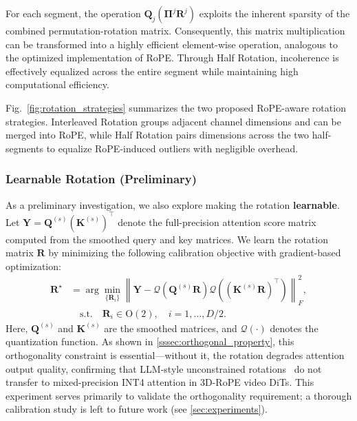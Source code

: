 For each segment, the operation $\mathbf{Q}_j(\mathbf{\Pi}^j \mathbf{R}^j)$ exploits the inherent sparsity of the combined permutation-rotation matrix. Consequently, this matrix multiplication can be transformed into a highly efficient element-wise operation, analogous to the optimized implementation of RoPE. Through Half Rotation, incoherence is effectively equalized across the entire segment while maintaining high computational efficiency.

Fig.~\ref{fig:rotation_strategies} summarizes the two proposed RoPE-aware rotation strategies. Interleaved Rotation groups adjacent channel dimensions and can be merged into RoPE, while Half Rotation pairs dimensions across the two half-segments to equalize RoPE-induced outliers with negligible overhead.



\subsubsection{Learnable Rotation (Preliminary)}
\label{sssec:learnable_rotation}

As a preliminary investigation, we also explore making the rotation \textbf{learnable}. Let $\mathbf{Y} = \mathbf{Q}^{(s)}(\mathbf{K}^{(s)})^\top$ denote the full-precision attention score matrix computed from the smoothed query and key matrices. We learn the rotation matrix $\mathbf{R}$ by minimizing the following calibration objective with gradient-based optimization:
\begin{align}
\mathbf{R}^{\star}
&=
\arg\min_{\{\mathbf{R}_i\}}
\left\|
\mathbf{Y}
-
\mathcal{Q}\!\left(\mathbf{Q}^{(s)}\mathbf{R}\right)
\mathcal{Q}\!\left((\mathbf{K}^{(s)}\mathbf{R})^\top\right)
\right\|_F^2,
\label{eq:learnable_rotation_obj}
\\
&\quad\text{s.t.}\quad
\mathbf{R}_i \in \mathrm{O}(2), \quad i=1,\dots,D/2 .
\end{align}
Here, $\mathbf{Q}^{(s)}$ and $\mathbf{K}^{(s)}$ are the smoothed matrices, and $\mathcal{Q}(\cdot)$ denotes the quantization function. As shown in \cref{sssec:orthogonal_property}, this orthogonality constraint is essential---without it, the rotation degrades attention output quality, confirming that LLM-style unconstrained rotations~\cite{liu2025spinquant,sun2025flatquant} do not transfer to 
mixed-precision INT4 attention in 3D-RoPE video DiTs.
This experiment serves primarily to validate the orthogonality requirement; a thorough calibration study is left to future work (see \cref{sec:experiments}).


